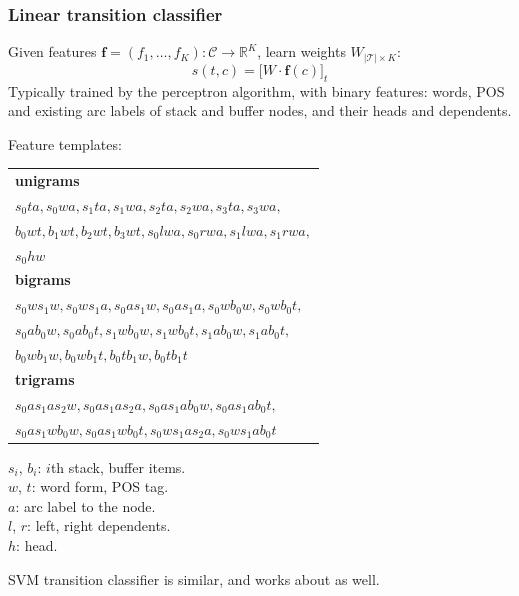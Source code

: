 \documentclass[t]{beamer}
\begin{document}
\begin{frame}
    \frametitle{Linear transition classifier \cite{Nivre03anefficient}}
    Given features $\mathbf{f}=(f_1, \ldots, f_K) : \mathcal{C}\to\mathbb{R}^K$, learn weights $W_{|\mathcal{T}|\times K}$:
    \[
    s(t,c)=\big[W\cdot\mathbf{f}(c)\big]_t
    \]
    Typically trained by the perceptron algorithm, with binary features:
	words, POS and existing arc labels of stack and buffer nodes, and
	their heads and dependents.
    
    \pause\vfill
    
    Feature templates:
    
    \begin{minipage}{.5\textwidth}
	\begin{adjustbox}{margin=3pt,frame,scale=.6}
	\begin{tabular}{l}
	\textbf{unigrams} \\
	$s_0ta, s_0wa, s_1ta, s_1wa, s_2ta, s_2wa, s_3ta, s_3wa,$ \\
	$b_0wt, b_1wt, b_2wt, b_3wt,s_0lwa, s_0rwa, s_1lwa, s_1rwa,$ \\
	$s_0hw$ \\
	\textbf{bigrams} \\
	$s_0ws_1w, s_0ws_1a, s_0as_1w, s_0as_1a, s_0wb_0w, s_0wb_0t,$ \\
	$s_0ab_0w, s_0ab_0t, s_1wb_0w, s_1wb_0t, s_1ab_0w, s_1ab_0t,$ \\
	$b_0wb_1w, b_0wb_1t, b_0tb_1w, b_0tb_1t$ \\
	\textbf{trigrams} \\
	$s_0as_1as_2w, s_0as_1as_2a, s_0as_1ab_0w, s_0as_1ab_0t,$ \\
	$s_0as_1wb_0w, s_0as_1wb_0t, s_0ws_1as_2a, s_0ws_1ab_0t$
	\end{tabular}
	\end{adjustbox}
	\end{minipage}
	\begin{minipage}{.45\textwidth}\scriptsize
	  $s_i$, $b_i$: $i$th stack, buffer items.\\
	  $w$, $t$: word form, POS tag. \\
	  $a$: arc label to the node.\\
	  $l$, $r$: left, right dependents. \\
	  $h$: head.
	\end{minipage}
	
	\pause\vfill
	
	SVM transition classifier is similar, and works about as well.
\end{frame}
\end{document}
